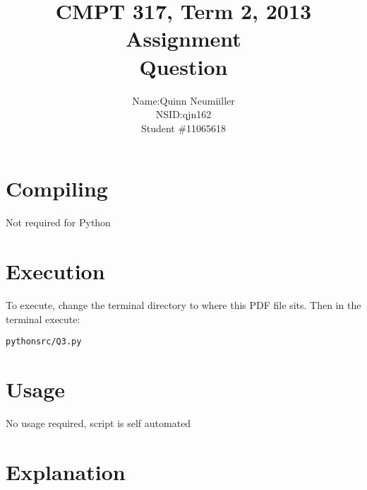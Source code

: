 \documentclass{article}
\title{CMPT 317, Term 2, 2013\\
Assignment \AssignmentNum\\
Question \QuestionNum\\
\AssignmentTitle
}
\author{
    \begin{tabular}{ l r }
      Name: & Quinn Neumiiller \\
      NSID: & qjn162 \\
      Student \# & 11065618 \\
    \end{tabular}
}
\date{\AssignmentDate}
\newcommand{\QuestionNum}{3}
\begin{document}
   \maketitle
   
   \section{Compiling}
   Not required for Python

   \section{Execution}
   To execute, change the terminal directory to where this PDF file sits.
   Then in the terminal execute:
    \begin{alltt}
    python src/Q\QuestionNum.py
    \end{alltt}

  \section{Usage}
    No usage required, script is self automated
  \section{Explanation}
\end{document}
